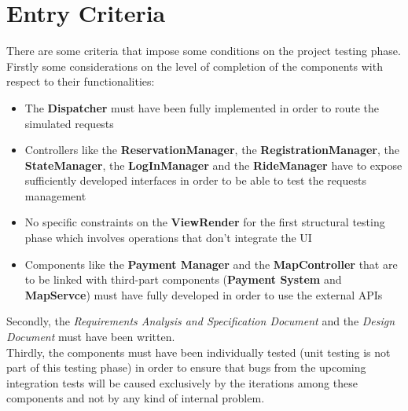 \documentclass[11pt,a4paper]{report}
\begin{document}
\section{Entry Criteria}
There are some criteria that impose some conditions on the project testing phase.\\
Firstly some considerations on the level of completion of the components with respect to their functionalities:
\begin{itemize}
	\item The \textbf{Dispatcher} must have been fully implemented in order to route the simulated requests
	\item Controllers like the \textbf{ReservationManager}, the \textbf{RegistrationManager}, the \textbf{StateManager}, the \textbf{LogInManager} and the \textbf{RideManager} have to expose sufficiently developed interfaces in order to be able to test the requests management
	\item No specific constraints on the \textbf{ViewRender} for the first structural testing phase which involves operations that don't integrate the UI
	\item Components like the \textbf{Payment Manager} and the \textbf{MapController} that are to be linked with third-part components (\textbf{Payment System} and \textbf{MapServce}) must have fully developed in order to use the external APIs
\end{itemize}
Secondly, the \textit{Requirements Analysis and Specification Document} and the \textit{Design Document} must have been written.\\
Thirdly, the components must have been individually tested (unit testing is not part of this testing phase) in order to ensure that bugs from the upcoming integration tests will be caused exclusively by the iterations among these components and not by any kind of internal problem.
\end{document}
